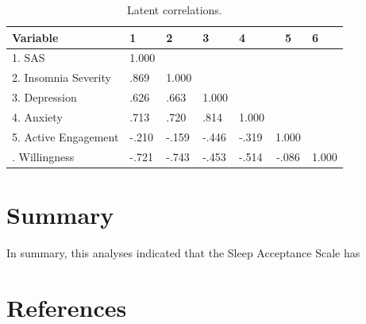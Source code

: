 \documentclass[
  letterpaper,
  DIV=11,
  numbers=noendperiod]{scrreprt}
\begin{document}
\begin{table}

\caption{Latent correlations.}
\centering
\begin{tabular}[t]{lllllcl}
\toprule
Variable & 1 & 2 & 3 & 4 & 5 & 6\\
\midrule
1. SAS & 1.000 &  &  &  &  & \\
2. Insomnia Severity & .869 & 1.000 &  &  &  & \\
3. Depression & .626 & .663 & 1.000 &  &  & \\
4. Anxiety & .713 & .720 & .814 & 1.000 &  & \\
5. Active Engagement & -.210 & -.159 & -.446 & -.319 & 1.000 & \\
\addlinespace
6. Willingness & -.721 & -.743 & -.453 & -.514 & -.086 & 1.000\\
\bottomrule
\end{tabular}
\end{table}


\hypertarget{summary}{%
\chapter{Summary}\label{summary}}

In summary, this analyses indicated that the Sleep Acceptance Scale has


\hypertarget{references}{%
\chapter*{References}\label{references}}

\end{document}
